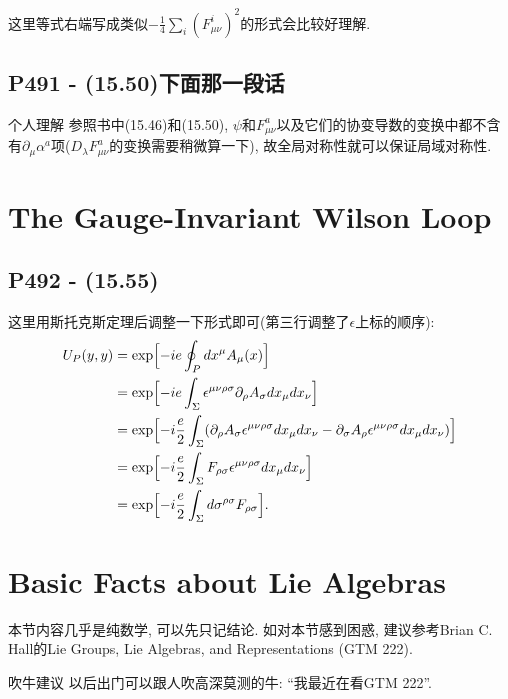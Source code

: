 这里等式右端写成类似$-\frac{1}{4}\sum_{i}(F^i_{\mu\nu})^2$的形式会比较好理解.

\subsection{P491 - (15.50)下面那一段话}

\begin{mybox}{个人理解}
  参照书中(15.46)和(15.50), $\psi$和$F^a_{\mu\nu}$以及它们的协变导数的变换中都不含有$\partial_{\mu}\alpha^a$项($D_{\lambda}F^a_{\mu\nu}$的变换需要稍微算一下), 故全局对称性就可以保证局域对称性.
\end{mybox}

\section{The Gauge-Invariant Wilson Loop}

\subsection{P492 - (15.55)}

这里用斯托克斯定理后调整一下形式即可(第三行调整了$\epsilon$上标的顺序):
\begin{equation}
  \begin{aligned}
    U_P(y, y) & = \exp\Bigl[ -ie \oint_P dx^{\mu} A_{\mu}(x) \Bigr]                                                                                                                                                \\
              & = \exp\Bigl[ -ie \int_{\Sigma} \epsilon^{\mu\nu\rho\sigma}\partial_{\rho} A_{\sigma} dx_{\mu}dx_{\nu}\Bigr]                                                                                        \\
              & = \exp\Bigl[ -i\frac{e}{2} \int_{\Sigma} (\partial_{\rho} A_{\sigma} \epsilon^{\mu\nu\rho\sigma} dx_{\mu}dx_{\nu} - \partial_{\sigma} A_{\rho} \epsilon^{\mu\nu\rho\sigma} dx_{\mu}dx_{\nu})\Bigr] \\
              & = \exp\Bigl[ -i\frac{e}{2} \int_{\Sigma} F_{\rho\sigma}\epsilon^{\mu\nu\rho\sigma} dx_{\mu}dx_{\nu}\Bigr]                                                                                          \\
              & = \exp\Bigl[ -i\frac{e}{2} \int_{\Sigma} d\sigma^{\rho\sigma} F_{\rho\sigma} \Bigr].
  \end{aligned}
\end{equation}

\section{Basic Facts about Lie Algebras}

本节内容几乎是纯数学, 可以先只记结论.
如对本节感到困惑, 建议参考Brian C. Hall的Lie Groups, Lie Algebras, and Representations (GTM 222).

\begin{mybox}{吹牛建议}
  以后出门可以跟人吹高深莫测的牛: “我最近在看GTM 222”.
\end{mybox}

